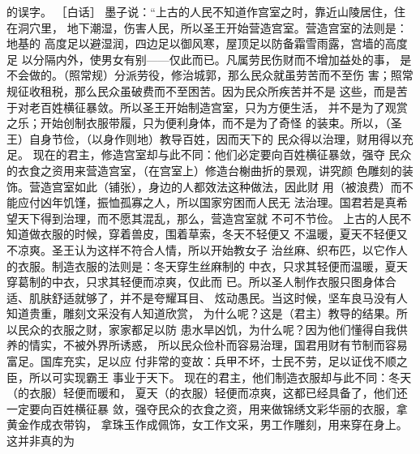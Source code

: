 \documentclass[12pt,UTF8]{ctexbook}
\begin{document}
的误字。 
［白话］ 
墨子说：“上古的人民不知道作宫室之时，靠近山陵居住，住在洞穴里， 
地下潮湿，伤害人民，所以圣王开始营造宫室。营造宫室的法则是：地基的 
高度足以避湿润，四边足以御风寒，屋顶足以防备霜雪雨露，宫墙的高度足 
以分隔内外，使男女有别——仅此而已。凡属劳民伤财而不增加益处的事， 
是不会做的。（照常规）分派劳役，修治城郭，那么民众就虽劳苦而不至伤 
害；照常规征收租税，那么民众虽破费而不至困苦。因为民众所疾苦并不是 
这些，而是苦于对老百姓横征暴敛。所以圣王开始制造宫室，只为方便生活， 
并不是为了观赏之乐；开始创制衣服带履，只为便利身体，而不是为了奇怪 
的装束。所以，（圣王）自身节俭，（以身作则地）教导百姓，因而天下的 
民众得以治理，财用得以充足。 
现在的君主，修造宫室却与此不同：他们必定要向百姓横征暴敛，强夺 
民众的衣食之资用来营造宫室，（在宫室上）修造台榭曲折的景观，讲究颜 
色雕刻的装饰。营造宫室如此（铺张），身边的人都效法这种做法，因此财 
用（被浪费）而不能应付凶年饥馑，振恤孤寡之人，所以国家穷困而人民无 
法治理。国君若是真希望天下得到治理，而不愿其混乱，那么，营造宫室就 
不可不节俭。 
上古的人民不知道做衣服的时候，穿着兽皮，围着草索，冬天不轻便又 
不温暖，夏天不轻便又不凉爽。圣王认为这样不符合人情，所以开始教女子 
治丝麻、织布匹，以它作人的衣服。制造衣服的法则是：冬天穿生丝麻制的 
中衣，只求其轻便而温暖，夏天穿葛制的中衣，只求其轻便而凉爽，仅此而 
已。所以圣人制作衣服只图身体合适、肌肤舒适就够了，并不是夸耀耳目、 
炫动愚民。当这时候，坚车良马没有人知道贵重，雕刻文采没有人知道欣赏， 
为什么呢？这是（君主）教导的结果。所以民众的衣服之财，家家都足以防 
患水旱凶饥，为什么呢？因为他们懂得自我供养的情实，不被外界所诱惑， 
所以民众俭朴而容易治理，国君用财有节制而容易富足。国库充实，足以应 
付非常的变故：兵甲不坏，士民不劳，足以证伐不顺之臣，所以可实现霸王 
事业于天下。 
现在的君主，他们制造衣服却与此不同：冬天（的衣服）轻便而暖和， 
夏天（的衣服）轻便而凉爽，这都已经具备了，他们还一定要向百姓横征暴 
敛，强夺民众的衣食之资，用来做锦绣文彩华丽的衣服，拿黄金作成衣带钩， 
拿珠玉作成佩饰，女工作文采，男工作雕刻，用来穿在身上。这并非真的为 
\end{document}
